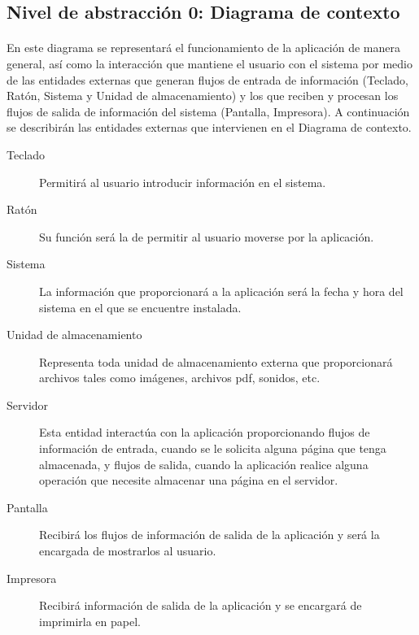 \subsection{Nivel de abstracción 0: Diagrama de contexto}

  \paragraph{}En este diagrama se representará el funcionamiento de la
  aplicación de manera general, así como la interacción que mantiene el usuario
  con el sistema por medio de las entidades externas que generan flujos de
  entrada de información (Teclado, Ratón, Sistema y Unidad de almacenamiento) y
  los que reciben y procesan los flujos de salida de información del sistema
  (Pantalla, Impresora). A continuación se describirán las entidades externas
  que intervienen en el Diagrama de contexto.

  \begin{description}
   \item[Teclado] Permitirá al usuario introducir información en el sistema.

   \item[Ratón] Su función será la de permitir al usuario moverse por la
                aplicación.
   \item[Sistema] La información que proporcionará a la aplicación será la fecha
                  y hora del sistema en el que se encuentre instalada.
   \item[Unidad de almacenamiento] Representa toda unidad de almacenamiento
                                   externa que proporcionará archivos tales como
                                   imágenes, archivos pdf, sonidos, etc.
   \item[Servidor] Esta entidad interactúa con la aplicación proporcionando
                   flujos de información de entrada, cuando se le solicita
                   alguna página que tenga almacenada, y flujos de salida,
                   cuando la aplicación realice alguna operación que necesite
                   almacenar una página en el servidor.
   \item[Pantalla] Recibirá los flujos de información de salida de la aplicación
                   y será la encargada de mostrarlos al usuario.
   \item[Impresora] Recibirá información de salida de la aplicación y se
                    encargará de imprimirla en papel.
  \end{description}

